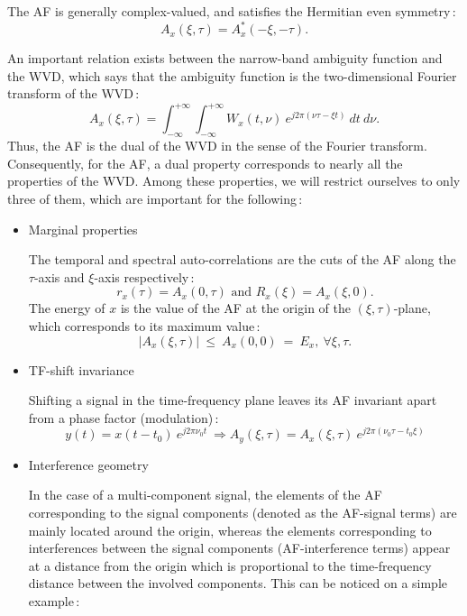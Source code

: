   The AF is generally complex-valued, and satisfies the Hermitian even
symmetry\,:
\[A_x(\xi,\tau) = A_x^*(-\xi,-\tau).\]

  An important relation exists between the narrow-band ambiguity function
and the WVD, which says that the ambiguity function is the two-dimensional
Fourier transform of the WVD\,:
\[A_x(\xi,\tau)=\int_{-\infty}^{+\infty} \int_{-\infty}^{+\infty}
W_x(t,\nu)\ e^{j2\pi(\nu \tau-\xi t)}\ dt\ d\nu.\] 
Thus, the AF is the dual of the WVD in the sense of the Fourier
transform. Consequently, for the AF, a dual property corresponds to nearly
all the properties of the WVD. Among these properties, we will
restrict ourselves to only three of them, which are important for the
following\,:
\begin{itemize} 
\item Marginal properties

  The temporal and spectral auto-correlations are the cuts of the AF along
the $\tau$-axis and $\xi$-axis respectively\,:
\[ r_x(\tau)=A_x(0,\tau) \mbox{ and } R_x(\xi)=A_x(\xi,0).\] 
The energy of $x$ is the value of the AF at the origin of the
$(\xi,\tau)$-plane, which corresponds to its maximum value\,:
\[|A_x(\xi,\tau)|\ \leq\ A_x(0,0)\ =\ E_x,\ \forall \xi, \tau.\]

\item TF-shift invariance

  Shifting a signal in the time-frequency plane leaves its AF invariant
apart from a phase factor (modulation)\,:
\[y(t) = x(t-t_0)\ e^{j2\pi \nu_0 t}\ 
 \Rightarrow A_y(\xi,\tau) = A_x(\xi,\tau)\ e^{j2\pi(\nu_0 \tau-t_0 \xi)}\]  

\item Interference geometry

  In the case of a multi-component signal, the elements of the AF
corresponding to the signal components (denoted as the AF-signal terms) are
mainly located around the origin, whereas the elements corresponding to
interferences between the signal components (AF-interference terms) appear
at a distance from the origin which is proportional to the time-frequency
distance between the involved components. This can be noticed on a simple
example\,:\\
 

\end{itemize}
